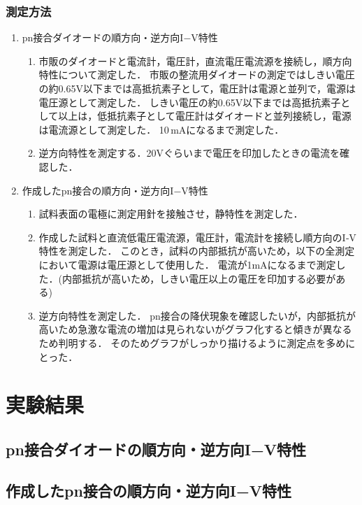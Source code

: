 \documentclass[11pt]{jarticle}
\begin{document}
		\subsubsection{測定方法}
			\begin{enumerate}
				\item pn接合ダイオードの順方向・逆方向I−V特性\\
					\begin{enumerate}
						\item 市販のダイオードと電流計，電圧計，直流電圧電流源を接続し，順方向特性について測定した．
							  市販の整流用ダイオードの測定ではしきい電圧の約0.65V以下までは高抵抗素子として，電圧計は電源と並列で，電源は電圧源として測定した．
							  しきい電圧の約0.65V以下までは高抵抗素子として以上は，低抵抗素子として電圧計はダイオードと並列接続し，電源は電流源として測定した．
							  10\,mAになるまで測定した．
						\item 逆方向特性を測定する．20Vぐらいまで電圧を印加したときの電流を確認した．
					\end{enumerate}
				\item 作成したpn接合の順方向・逆方向I−V特性\\
					\begin{enumerate}
						\item 試料表面の電極に測定用針を接触させ，静特性を測定した．
						\item 作成した試料と直流低電圧電流源，電圧計，電流計を接続し順方向のI‐V特性を測定した．
							  このとき，試料の内部抵抗が高いため，以下の全測定において電源は電圧源として使用した．
							  電流が1mAになるまで測定した．(内部抵抗が高いため，しきい電圧以上の電圧を印加する必要がある)
						\item 逆方向特性を測定した．
							  pn接合の降伏現象を確認したいが，内部抵抗が高いため急激な電流の増加は見られないがグラフ化すると傾きが異なるため判明する．
							  そのためグラフがしっかり描けるように測定点を多めにとった．
					\end{enumerate}
			\end{enumerate}

\section{実験結果}
	\subsection{pn接合ダイオードの順方向・逆方向I−V特性}
	\subsection{作成したpn接合の順方向・逆方向I−V特性}
\end{document}
